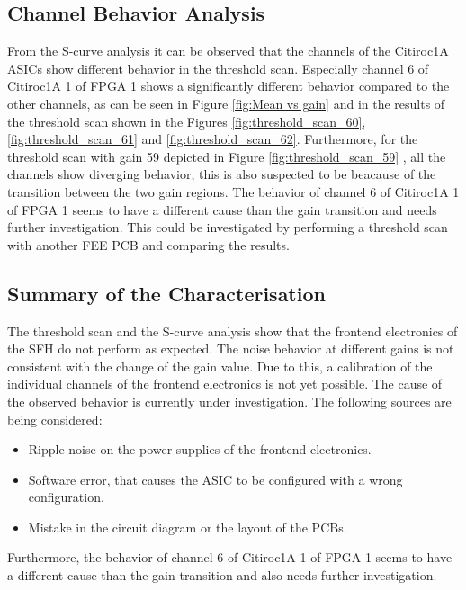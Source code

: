     \subsection{Channel Behavior Analysis}
    From the S-curve analysis it can be observed that the channels of the Citiroc1A ASICs show different behavior in the threshold scan.
    \newline
    Especially channel 6 of Citiroc1A 1 of FPGA 1 shows a significantly different behavior compared to the other channels,
    as can be seen in Figure \ref{fig:Mean vs gain} and in the results of the threshold scan shown in the Figures \ref{fig:threshold_scan_60}, \ref{fig:threshold_scan_61} and \ref{fig:threshold_scan_62}.
    \newline
    Furthermore, for the threshold scan with gain 59 depicted in Figure \ref{fig:threshold_scan_59} , all the channels show diverging behavior, this is also suspected to be beacause of the transition between the two gain regions.
    \newline
    The behavior of channel 6 of Citiroc1A 1 of FPGA 1 seems to have a different cause than the gain transition and needs further investigation.
    This could be investigated by performing a threshold scan with another FEE PCB and comparing the results.
    \subsection{Summary of the Characterisation}
    The threshold scan and the S-curve analysis show that the frontend electronics of the SFH do not perform as expected.
    The noise behavior at different gains is not consistent with the change of the gain value.
    \newline
    Due to this, a calibration of the individual channels of the frontend electronics is not yet possible.
    The cause of the observed behavior is currently under investigation. The following sources are being considered:
    \begin{itemize}
        \item Ripple noise on the power supplies of the frontend electronics.
        \item Software error, that causes the ASIC to be configured with a wrong configuration.
        \item Mistake in the circuit diagram or the layout of the PCBs. 
    \end{itemize}
    Furthermore, the behavior of channel 6 of Citiroc1A 1 of FPGA 1 seems to have a different cause than the gain transition and also needs further investigation.
    
    

     
